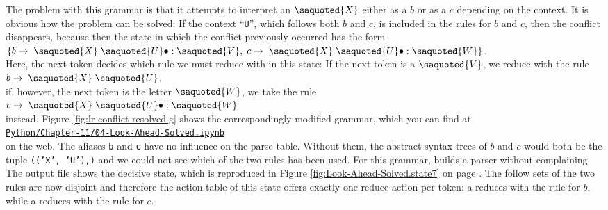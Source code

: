 The problem with this grammar is that it attempts to interpret an $\saquoted{X}$ either
as a $b$ or as a $c$ depending on the context. It is obvious how the problem can be
solved: If the context ``\texttt{U}'', which follows both $b$ and $c$, is included in
the rules for $b$ and $c$, then the conflict disappears, because then the
state in which the conflict previously occurred has the form
\\[0.2cm]
\hspace*{1.3cm}
$\{ b \rightarrow \;\saquoted{X}\; \saquoted{U}\bullet: \saquoted{V},\;
    c \rightarrow \;\saquoted{X}\; \saquoted{U}\bullet: \saquoted{W}
\}
$.
\\[0.2cm]
Here, the next token decides which rule we must reduce with in this state:
If the next token is a $\saquoted{V}$, we reduce with the rule
\\[0.2cm]
\hspace*{1.3cm}
$b \rightarrow \;\saquoted{X}\; \saquoted{U}$,
\\[0.2cm]
if, however, the next token is the letter $\saquoted{W}$, we take the rule
\\[0.2cm]
\hspace*{1.3cm}
$c \rightarrow \;\saquoted{X}\; \saquoted{U}\bullet: \saquoted{W}$ 
\\[0.2cm]
instead.  Figure
\ref{fig:lr-conflict-resolved.g} shows the correspondingly modified grammar, which you can find at
\\[0.2cm]
\hspace*{1.3cm}
\href{https://github.com/karlstroetmann/Formal-Languages/tree/master/Python/Chapter-11/04-Look-Ahead-Solved.ipynb}{\texttt{Python/Chapter-11/04-Look-Ahead-Solved.ipynb}}
\\[0.2cm]
on the web.  The aliases \texttt{b} and \texttt{c} have no influence on the parse table.  Without them, the
abstract syntax trees of $b$ and $c$ would both be the tuple \texttt{(('X', 'U'),)} and we could not see which of
the two rules has been used.  For this grammar,  builds a parser without complaining.  The
output file shows the decisive state, which is reproduced in Figure \ref{fig:Look-Ahead-Solved.state7} on page
\pageref{fig:Look-Ahead-Solved.state7}.  The follow sets of the two rules are now disjoint and therefore the
action table of this state offers exactly one reduce action per token: a  reduces with the rule for
$b$, while a  reduces with the rule for $c$.

